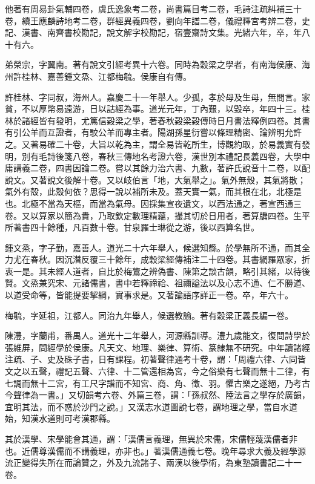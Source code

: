 \begin{pinyinscope}
他著有周易卦氣輔四卷，虞氏逸象考二卷，尚書篇目考二卷，毛詩注疏糾補三十卷，續王應麟詩地考二卷，群經異義四卷，劉向年譜二卷，儀禮釋宮考辨二卷，史記、漢書、南齊書校勘記，說文解字校勘記，宿壹齋詩文集。光緒六年，卒，年八十有六。

弟榮宗，字翼南。著有說文引經考異十六卷。同時為穀梁之學者，有南海侯康、海州許桂林、嘉善鍾文烝、江都梅毓。侯康自有傳。

許桂林、字同叔，海州人。嘉慶二十一年舉人。少孤，孝於母及生母，無間言。家貧，不以厚幣易遠游，日以詁經為事。道光元年，丁內艱，以毀卒，年四十三。桂林於諸經皆有發明，尤篤信穀梁之學，著春秋穀梁穀傳時日月書法釋例四卷。其書有引公羊而互證者，有駮公羊而專主者。陽湖孫星衍嘗以條理精密、論辨明允許之。又著易確二十卷，大旨以乾為主，謂全易皆乾所生，博觀約取，於易義實有發明，別有毛詩後箋八卷，春秋三傳地名考證六卷，漢世別本禮記長義四卷，大學中庸講義二卷，四書因論二卷。嘗以其餘力治六書、九數，著許氏說音十二卷，以配說文。又著說文後解十卷。又以岐伯言「地，大氣舉之」。氣外無殼，其氣將散；氣外有殼，此殼何依？思得一說以補所未及。蓋天實一氣，而其根在北，北極是也。北極不當為天樞，而當為氣母。因採集宣夜遺文，以西法通之，著宣西通三卷。又以算家以簡為貴，乃取欽定數理精蘊，撮其切於日用者，著算牖四卷。生平所著書四十餘種，凡百數十卷。甘泉羅士琳從之游，後以西算名世。

鍾文烝，字子勤，嘉善人。道光二十六年舉人，候選知縣。於學無所不通，而其全力尤在春秋。因沉潛反覆三十餘年，成穀梁經傳補注二十四卷。其書網羅眾家，折衷一是。其未經人道者，自比於梅鷟之辨偽書、陳第之談古韻，略引其緒，以待後賢。文烝兼究宋、元諸儒書，書中若釋禘祫、祖禰謚法以及心志不通、仁不勝道、以道受命等，皆能提要挈綱，實事求是。又著論語序詳正一卷。卒，年六十。

梅毓，字延祖，江都人。同治九年舉人，候選教諭。著有穀梁正義長編一卷。

陳澧，字蘭甫，番禺人。道光十二年舉人，河源縣訓導。澧九歲能文，復問詩學於張維屏，問經學於侯康。凡天文、地理、樂律、算術、篆隸無不研究。中年讀諸經注疏、子、史及硃子書，日有課程。初著聲律通考十卷，謂：「周禮六律、六同皆文之以五聲，禮記五聲、六律、十二管還相為宮，今之俗樂有七聲而無十二律，有七調而無十二宮，有工尺字譜而不知宮、商、角、徵、羽。懼古樂之遂絕，乃考古今聲律為一書。」又切韻考六卷、外篇三卷，謂：「孫叔然、陸法言之學存於廣韻，宜明其法，而不惑於沙門之說。」又漢志水道圖說七卷，謂地理之學，當自水道始，知漢水道則可考漢郡縣。

其於漢學、宋學能會其通，謂：「漢儒言義理，無異於宋儒，宋儒輕蔑漢儒者非也。近儒尊漢儒而不講義理，亦非也。」著漢儒通義七卷。晚年尋求大義及經學源流正變得失所在而論贊之，外及九流諸子、兩漢以後學術，為東塾讀書記二十一卷。


\end{pinyinscope}

